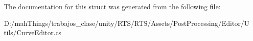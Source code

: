 The documentation for this struct was generated from the following file\+:\begin{DoxyCompactItemize}
\item 
D\+:/mah\+Things/trabajos\+\_\+clase/unity/\+R\+T\+S/\+R\+T\+S/\+Assets/\+Post\+Processing/\+Editor/\+Utils/Curve\+Editor.\+cs\end{DoxyCompactItemize}
